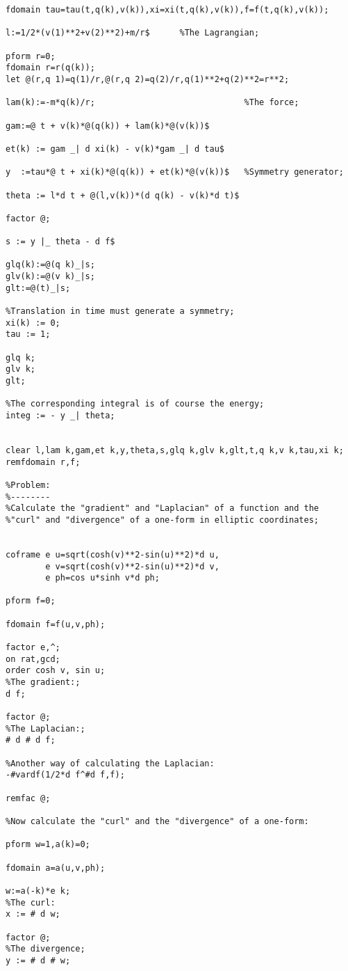 {\begin{verbatim}
fdomain tau=tau(t,q(k),v(k)),xi=xi(t,q(k),v(k)),f=f(t,q(k),v(k));

l:=1/2*(v(1)**2+v(2)**2)+m/r$      %The Lagrangian;

pform r=0;
fdomain r=r(q(k));
let @(r,q 1)=q(1)/r,@(r,q 2)=q(2)/r,q(1)**2+q(2)**2=r**2;

lam(k):=-m*q(k)/r;                              %The force;

gam:=@ t + v(k)*@(q(k)) + lam(k)*@(v(k))$

et(k) := gam _| d xi(k) - v(k)*gam _| d tau$

y  :=tau*@ t + xi(k)*@(q(k)) + et(k)*@(v(k))$   %Symmetry generator;

theta := l*d t + @(l,v(k))*(d q(k) - v(k)*d t)$

factor @;

s := y |_ theta - d f$

glq(k):=@(q k)_|s;
glv(k):=@(v k)_|s;
glt:=@(t)_|s;

%Translation in time must generate a symmetry;
xi(k) := 0;
tau := 1;

glq k;
glv k;
glt;

%The corresponding integral is of course the energy;
integ := - y _| theta;


clear l,lam k,gam,et k,y,theta,s,glq k,glv k,glt,t,q k,v k,tau,xi k;
remfdomain r,f;

%Problem:
%--------
%Calculate the "gradient" and "Laplacian" of a function and the
%"curl" and "divergence" of a one-form in elliptic coordinates;


coframe e u=sqrt(cosh(v)**2-sin(u)**2)*d u,
        e v=sqrt(cosh(v)**2-sin(u)**2)*d v,
        e ph=cos u*sinh v*d ph;

pform f=0;

fdomain f=f(u,v,ph);

factor e,^;
on rat,gcd;
order cosh v, sin u;
%The gradient:;
d f;

factor @;
%The Laplacian:;
# d # d f;

%Another way of calculating the Laplacian:
-#vardf(1/2*d f^#d f,f);

remfac @;

%Now calculate the "curl" and the "divergence" of a one-form:

pform w=1,a(k)=0;

fdomain a=a(u,v,ph);

w:=a(-k)*e k;
%The curl:
x := # d w;

factor @;
%The divergence;
y := # d # w;


\end{verbatim}}
